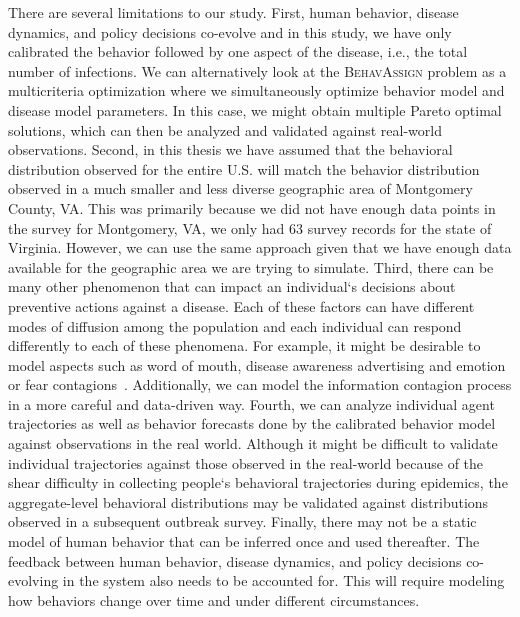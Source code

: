 \documentclass[doublespace]{VTthesis}
\begin{document}
    There are several limitations to our study. First, human behavior, disease dynamics, and policy decisions co-evolve and in this study, we have only calibrated the behavior followed by one aspect of the disease, i.e., the total number of infections. We can alternatively look at the \textsc{BehavAssign} problem as a multicriteria optimization where we simultaneously optimize behavior model and disease model parameters. In this case, we might obtain multiple Pareto optimal solutions, which can then be analyzed and validated against real-world observations. Second, in this thesis we have assumed that the behavioral distribution observed for the entire U.S. will match the behavior distribution observed in a much smaller and less diverse geographic area of Montgomery County, VA. This was primarily because we did not have enough data points in the survey for Montgomery, VA, we only had 63 survey records for the state of Virginia. However, we can use the same approach given that we have enough data available for the geographic area we are trying to simulate. Third, there can be many other phenomenon that can impact an individual`s decisions about preventive actions against a disease. Each of these factors can have different modes of diffusion among the population and each individual can respond differently to each of these phenomena. For example, it might be desirable to model aspects such as word of mouth, disease awareness advertising and emotion or fear contagions~\cite{epstein08coupled}. Additionally, we can model the information contagion process in a more careful and data-driven way. Fourth, we can analyze individual agent trajectories as well as behavior forecasts done by the calibrated behavior model against observations in the real world. Although it might be difficult to validate individual trajectories against those observed in the real-world because of the shear difficulty in collecting people`s behavioral trajectories during epidemics, the aggregate-level behavioral distributions may be validated against distributions observed in a subsequent outbreak survey. Finally, there may not be a static model of human behavior that can be inferred once and used thereafter. The feedback between human behavior, disease dynamics, and policy decisions co-evolving in the system also needs to be accounted for. This will require modeling how behaviors change over time and under different circumstances. 
    
\end{document}
